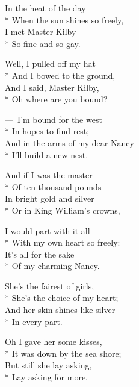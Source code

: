 
\versemark
In the heat of the day\\*
When the sun shines so freely,\\
I met Master Kilby\\*
So fine and so gay.

\versemark
Well, I pulled off my hat\\*
And I bowed to the ground,\\
And I said, Master Kilby,\\*
Oh where are you bound?

\versemark
— I’m bound for the west\\*
In hopes to find rest;\\
And in the arms of my dear Nancy\\*
I’ll build a new nest.

\versemark
And if I was the master\\*
Of ten thousand pounds\\
In bright gold and silver\\*
Or in King William’s crowns,

\versemark
I would part with it all\\*
With my own heart so freely:\\
It’s all for the sake\\*
Of my charming Nancy.

\versemark
She’s the fairest of girls,\\*
She’s the choice of my heart;\\
And her skin shines like silver\\*
In every part.

\versemark
Oh I gave her some kisses,\\*
It was down by the sea shore;\\
But still she lay asking,\\*
Lay asking for more.

